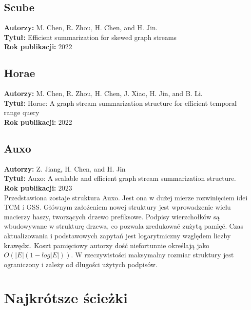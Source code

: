 \documentclass{article}
\begin{document}
        \subsection{Scube\cite{Chen_Zhou_Chen_Jin_2022}}
            \textbf{Autorzy: } M. Chen, R. Zhou, H. Chen, and H. Jin.\\
            \textbf{Tytuł: } Efficient summarization for skewed graph streams\\
            \textbf{Rok publikacji: } 2022\\

        \subsection{Horae\cite{Chen_Zhou_Chen_Xiao_Jin_Li_2022}}
            \textbf{Autorzy: } M. Chen, R. Zhou, H. Chen, J. Xiao, H. Jin, and B. Li.\\
            \textbf{Tytuł: } Horae: A graph stream summarization structure for
            efficient temporal range query\\
            \textbf{Rok publikacji: } 2022\\

        \subsection{Auxo\cite{Jiang_Chen_Jin_2023}}
            \textbf{Autorzy:} Z. Jiang, H. Chen, and H. Jin \\
            \textbf{Tytuł:} Auxo: A scalable and efficient graph stream summarization structure. \\
            \textbf{Rok publikacji:} 2023 \\

            Przedstawiona zostaje struktura Auxo. Jest ona w dużej mierze rozwinięciem idei TCM i GSS. Głównym założeniem nowej struktury jest wprowadzenie wielu macierzy haszy, tworzących drzewo prefiksowe. Podpisy wierzchołków są wbudowywane w strukturę drzewa, co pozwala zredukować zużytą pamięć. Czas aktualizowania i podstawowych zapytań jest logarytmiczny względem liczby krawędzi. Koszt pamięciowy autorzy dość niefortunnie określają jako $O(|E|(1 - log|E|))$. W rzeczywistości maksymalny rozmiar struktury jest ograniczony i zależy od długości użytych podpisów. 

    \section{Najkrótsze ścieżki}
\end{document}
